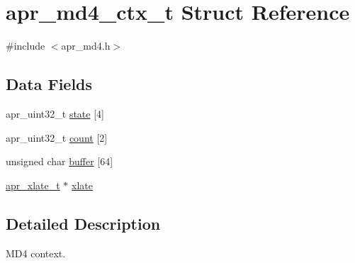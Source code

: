 \hypertarget{structapr__md4__ctx__t}{\section{apr\-\_\-md4\-\_\-ctx\-\_\-t Struct Reference}
\label{structapr__md4__ctx__t}
}


{\ttfamily \#include $<$apr\-\_\-md4.\-h$>$}

\subsection*{Data Fields}
\begin{DoxyCompactItemize}
\item 
apr\-\_\-uint32\-\_\-t \hyperlink{structapr__md4__ctx__t_a7fc20af590cdf6d01208a12ac0bbc5de}{state} \mbox{[}4\mbox{]}
\item 
apr\-\_\-uint32\-\_\-t \hyperlink{structapr__md4__ctx__t_a0332072316c6a931b6fb1bd8729e3495}{count} \mbox{[}2\mbox{]}
\item 
unsigned char \hyperlink{structapr__md4__ctx__t_a60ce2de9e1c0b8888d81da03afdbfcdb}{buffer} \mbox{[}64\mbox{]}
\item 
\hyperlink{group___a_p_r___x_l_a_t_e_ga069dabbadc30e3a4157c38104a250e77}{apr\-\_\-xlate\-\_\-t} $\ast$ \hyperlink{structapr__md4__ctx__t_ae4dd6785ef4bf0e04b37d566af786554}{xlate}
\end{DoxyCompactItemize}


\subsection{Detailed Description}
M\-D4 context. 

